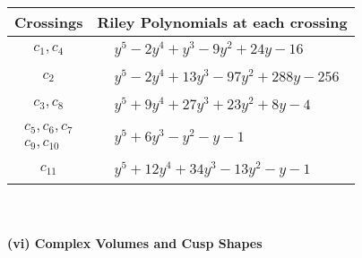 \documentclass[1p]{elsarticle_modified}
\theoremstyle{definition}
\begin{document}
\begin{tabular}{m{50pt}|m{274pt}}
Crossings & \hspace{64pt}Riley Polynomials at each crossing \\
\hline $$\begin{aligned}c_{1},c_{4}\end{aligned}$$&$\begin{aligned}
&y^5-2 y^4+y^3-9 y^2+24 y-16
\end{aligned}$\\
\hline $$\begin{aligned}c_{2}\end{aligned}$$&$\begin{aligned}
&y^5-2 y^4+13 y^3-97 y^2+288 y-256
\end{aligned}$\\
\hline $$\begin{aligned}c_{3},c_{8}\end{aligned}$$&$\begin{aligned}
&y^5+9 y^4+27 y^3+23 y^2+8 y-4
\end{aligned}$\\
\hline $$\begin{aligned}c_{5},c_{6},c_{7}\\c_{9},c_{10}\end{aligned}$$&$\begin{aligned}
&y^5+6 y^3- y^2- y-1
\end{aligned}$\\
\hline $$\begin{aligned}c_{11}\end{aligned}$$&$\begin{aligned}
&y^5+12 y^4+34 y^3-13 y^2- y-1
\end{aligned}$\\
\hline
\end{tabular}\\~\\
\newpage\flushleft \textbf{(vi) Complex Volumes and Cusp Shapes}
\end{document}
